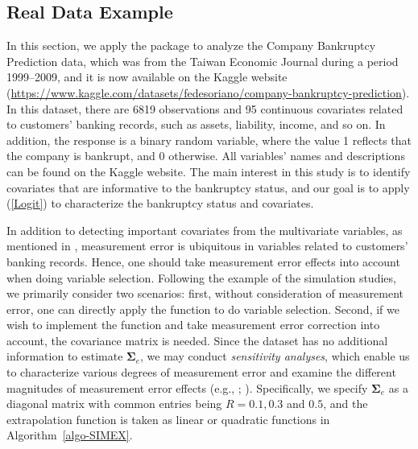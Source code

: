 


\subsection{Real Data Example}



In this section, we apply the package  to analyze the Company Bankruptcy Prediction data, which was from the Taiwan Economic Journal during a period 1999–2009, and it is now available on the Kaggle website (\url{https://www.kaggle.com/datasets/fedesoriano/company-bankruptcy-prediction}). In this dataset, there are 6819 observations and {95 continuous covariates related to customers' banking records}, such as assets, liability, income, and so on. In addition, the response is a binary random variable, where {the} value 1 reflects that the company is bankrupt, and 0 otherwise. All variables' names and descriptions can be found {on} the Kaggle website. The main interest in this study is to identify covariates that are informative to the bankruptcy status, and our goal is to apply (\ref{Logit}) to characterize the bankruptcy status and covariates. 


In addition to detecting important covariates from the multivariate variables, as mentioned in \cite{Chen:2023b}, measurement error is ubiquitous {in variables related to customers' banking records.} Hence, one should take measurement error effects into account when doing variable selection. Following {the example of the} simulation studies, we primarily consider two scenarios: first, without consideration of measurement error, one can directly apply the function  to do variable selection. Second, if we wish to implement the function  and take measurement error correction into account, the covariance matrix  is needed. Since the dataset has no additional information to estimate $\boldsymbol{\Sigma}_e$, we may conduct {\em sensitivity analyses}, which enable us to characterize various degrees of measurement error and examine the different magnitudes of measurement error effects (e.g., \citealp{ChenYi:2021}; \citealp{Chen:2023b}). Specifically, we specify $\boldsymbol{\Sigma}_e$ as a diagonal matrix with common entries being $R=0.1, 0.3$ and $0.5$, and the extrapolation function is taken as linear or quadratic functions in Algorithm~\ref{algo-SIMEX}. 



